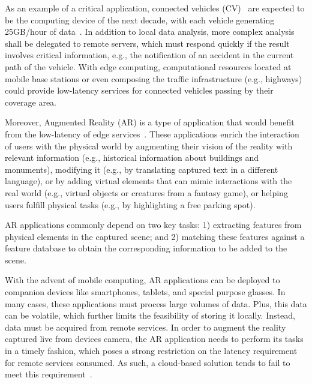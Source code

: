 As an example of a critical application, connected vehicles (CV)~\cite{Bonomi:2012} are expected to be the computing device of the next decade, with each vehicle generating 25GB/hour of data~\cite{HitachiInternetOnWheels16}. In addition to local data analysis, more complex analysis shall be delegated to remote servers, which must respond quickly if the result involves critical information, e.g., the notification of an accident in the current path of the vehicle. With edge computing, computational resources located at mobile base stations or even composing the traffic infrastructure (e.g., highways) could provide low-latency services for connected vehicles passing by their coverage area.

Moreover, Augmented Reality (AR) is a type of application that would benefit from the low-latency of edge services~\cite{hu2015mobile,GarrigaMendonca2017}. These applications enrich the interaction of users with the physical
world by augmenting their vision of the reality with relevant information (e.g., historical information about buildings and monuments), modifying it (e.g., by translating captured text in a different language), or by adding virtual elements that can mimic interactions with the real world (e.g., virtual objects or creatures
from a fantasy game), or helping users fulfill physical tasks (e.g., by highlighting a free parking spot).

AR applications commonly depend on two key tasks: 1) extracting features from physical elements in the captured scene; and 2) matching these features against a feature database to obtain the corresponding information to be added to the scene. 

With the advent of mobile computing, AR applications can be deployed to companion devices like smartphones, tablets, and special purpose glasses. In many cases, these applications must process large volumes of data. Plus, this data can be volatile, which further limits the feasibility of storing it locally. Instead, data must be acquired from remote services. In order to augment the reality captured live from devices camera, the AR application needs to perform its tasks in a timely fashion, which poses a strong restriction on the latency requirement for remote services consumed. As such, a cloud-based solution tends to fail to meet this requirement~\cite{GarrigaMendonca2017}. 


